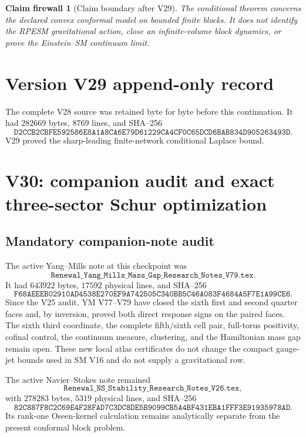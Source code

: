 \documentclass[11pt]{article}
\newtheorem{firewall}[theorem]{Claim firewall}
\theoremstyle{remark}
\begin{document}
\begin{firewall}[Claim boundary after V29]
\label{fire:v17v29}
The conditional theorem concerns the declared convex conformal model
on bounded finite blocks.  It does not identify the RPESM gravitational
action, close an infinite-volume block dynamics, or prove the
Einstein--SM continuum limit.
\end{firewall}

\section*{Version V29 append-only record}
The complete V28 source was retained byte for byte before this
continuation.  It had \(282669\) bytes, \(8769\) lines, and SHA--256
\[
 \texttt{D2CCB2CBFE592586E8A1A8CA6E79D61229CA4CF0C65DCD6BAB834D905263493D}.
\]
V29 proved the sharp-leading finite-network conditional Laplace bound.


\section{V30: companion audit and exact three-sector Schur optimization}
\label{sec:v17v30}

\subsection{Mandatory companion-note audit}

The active Yang--Mills note at this checkpoint was
\[
 \texttt{Renewal\_Yang\_Mills\_Mass\_Gap\_Research\_Notes\_V79.tex}.
                                                               \tag{30.1}
\]
It had \(643922\) bytes, \(17592\) physical lines, and SHA--256
\[
 \texttt{F68AEEEB02910AD4538E270EF9A742505C340BB5C46A083F4684A5F7E1A99CE6}.
                                                               \tag{30.2}
\]
Since the V25 audit, YM V77--V79 have closed the sixth first and second
quarter faces and, by inversion, proved both direct response signs on
the paired faces.  The sixth third coordinate, the complete
fifth/sixth cell pair, full-torus positivity, cofinal control, the
continuum measure, clustering, and the Hamiltonian mass gap remain
open.  These new local atlas certificates do not change the compact
gauge-jet bounds used in SM V16 and do not supply a gravitational row.

The active Navier--Stokes note remained
\[
 \texttt{Renewal\_NS\_Stability\_Research\_Notes\_V26.tex},     \tag{30.3}
\]
with \(278283\) bytes, \(5319\) physical lines, and SHA--256
\[
 \texttt{82C887F8C2C69E4F28FAD7C3DC8DE5B9099CB5A4BF431EBA1FFF3E91935978AD}.
                                                               \tag{30.4}
\]
Its rank-one Oseen-kernel calculation remains analytically separate
from the present conformal block problem.
\end{document}
